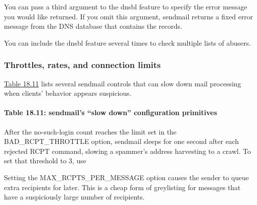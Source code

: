 You can pass a third argument to the {dnsbl} feature to specify the
error message you would like returned. If you omit this argument,
{sendmail} returns a fixed error message from the DNS database that
contains the records.

You can include the {dnsbl} feature several times to check multiple
lists of abusers.

\subsubsection[Throttles, rates, and connection
limits]{\texorpdfstring{\protect\hypertarget{part0026_split_037.htmlux5cux23_idTextAnchor1097}{}{}Throttles,
rates, and connection limits}{Throttles, rates, and connection limits}}

\protect\hyperlink{part0026_split_037.htmlux5cux23_idTextAnchor1098}{Table
18.11} lists several {sendmail} controls that can slow down mail
processing when clients' behavior appears suspicious.

\paragraph[{Table 18.11: }'s ``slow down'' configuration
primitives]{\texorpdfstring{{Table 18.11:
}{\protect\hypertarget{part0026_split_037.htmlux5cux23_idTextAnchor1098}{}{}\protect\hypertarget{part0026_split_037.htmlux5cux23_idTextAnchor1099}{}{}sendmail}'s
``slow down'' configuration
primitives{\protect\hypertarget{part0026_split_037.htmlux5cux23_idIndexMarker2572}{}{}\protect\hypertarget{part0026_split_037.htmlux5cux23_idIndexMarker2573}{}{}\protect\hypertarget{part0026_split_037.htmlux5cux23_idIndexMarker2574}{}{}\protect\hypertarget{part0026_split_037.htmlux5cux23_idIndexMarker2575}{}{}\protect\hypertarget{part0026_split_037.htmlux5cux23_idIndexMarker2576}{}{}}}{Table 18.11: sendmail's ``slow down'' configuration primitives}}


After the no-such-login count reaches the limit set in the
{BAD\_RCPT\_THROTTLE} option, {sendmail} sleeps for one second after
each rejected {RCPT} command, slowing a spammer's address harvesting to
a crawl. To set that threshold to 3, use


Setting the {MAX\_RCPTS\_PER\_MESSAGE} option causes the sender to queue
extra recipients for later. This is a cheap form of greylisting for
messages that have a suspiciously large number of recipients.

